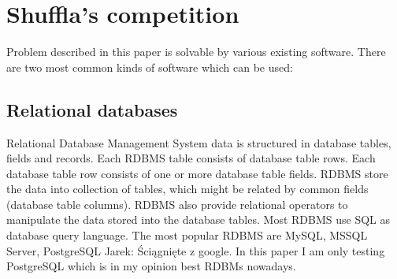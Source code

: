 \documentclass[10pt,a4paper]{article}
\newcommand{\jarek}[1]{\noindent\colorbox{myYellow}{Jarek: #1}}
\begin{document}
\section{Shuffla's competition}
Problem described in this paper is solvable by various existing software. There are two most common kinds of software which can be used:

\subsection{Relational databases}
Relational Database Management System data is structured in database tables, fields and records. Each RDBMS table consists of database table rows. Each database table row consists of one or more database table fields. RDBMS store the data into collection of tables, which might be related by common fields (database table columns). RDBMS also provide relational operators to manipulate the data stored into the database tables. Most RDBMS use SQL as database query language. The most popular RDBMS are MySQL, MSSQL Server, PostgreSQL \jarek{Ściągnięte z google}. In this paper I am only testing PostgreSQL which is in my opinion best RDBMs nowadays.
\end{document}

